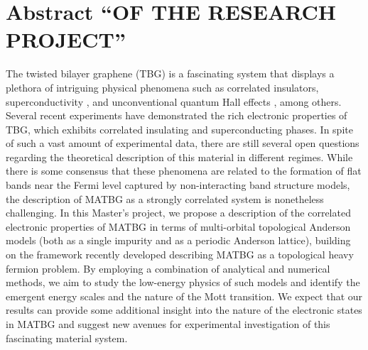 \documentclass[12pt]{report}
\begin{document}
%
%
\geraTitulo
%
\folhaDeRosto
%
%
%
\tableofcontents
\thispagestyle{empty}
\clearpage
%

\sectionfont{\scshape}



\chapter{Abstract ``OF THE RESEARCH PROJECT''} \label{chp:abstract}

The twisted bilayer graphene (TBG) is a fascinating system that displays a plethora of intriguing physical phenomena such as correlated insulators, superconductivity \cite{cao2018}, and unconventional quantum Hall effects \cite{unconv_QHE_tbg_2006}, among others. Several recent experiments have demonstrated the rich electronic properties of TBG, which exhibits correlated insulating and superconducting phases. In spite of such a vast amount of experimental data, there are still several open questions regarding the theoretical description of this material in different regimes. While there is some consensus that these phenomena are related to the formation of flat bands near the Fermi level captured by non-interacting band structure models, the description of MATBG as a strongly correlated system is nonetheless challenging. In this Master's project, we propose a description of the correlated electronic properties of MATBG in terms of multi-orbital topological Anderson models (both as a single impurity and as a periodic Anderson lattice), building on the framework recently developed describing MATBG as a topological heavy fermion problem. By employing a combination of analytical and numerical methods, we aim to study the low-energy physics of such models and identify the emergent energy scales and the nature of the Mott transition. We expect that our results can provide some additional insight into the nature of the electronic states in MATBG and suggest new avenues for experimental investigation of this fascinating material system.
\end{document}
